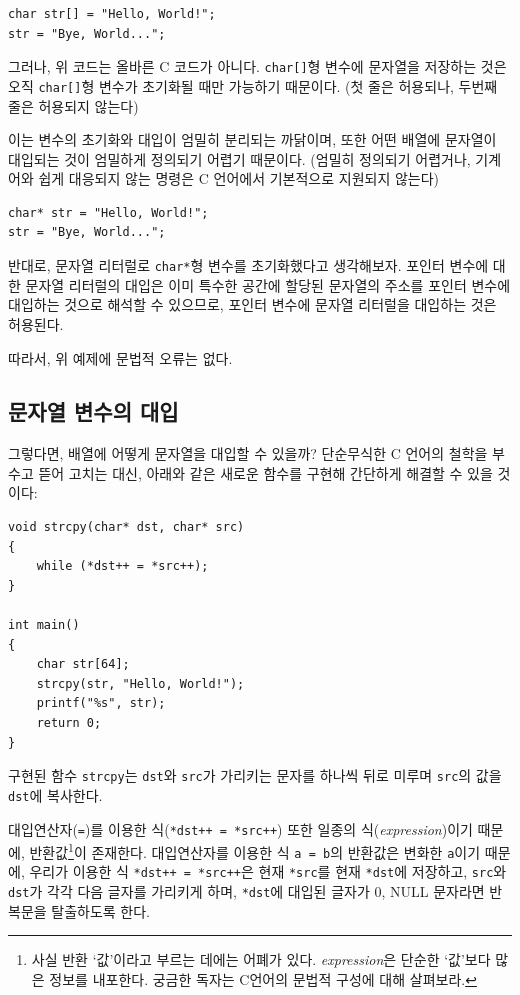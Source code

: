 \documentclass[a4paper,12pt]{book}
\newcommand{\V}[1]{\Verb|#1|}
\begin{document}
        \begin{lstlisting}
char str[] = "Hello, World!";
str = "Bye, World...";
        \end{lstlisting}

        그러나, 위 코드는 올바른 C 코드가 아니다.
        \V{char[]}형 변수에 문자열을 저장하는 것은
        오직 \V{char[]}형 변수가 초기화될 때만 가능하기 때문이다.
        (첫 줄은 허용되나, 두번째 줄은 허용되지 않는다)

        이는 변수의 초기화와 대입이 엄밀히 분리되는 까닭이며,
        또한 어떤 배열에 문자열이 대입되는 것이 엄밀하게 정의되기 어렵기 때문이다.
        (엄밀히 정의되기 어렵거나, 기계어와 쉽게 대응되지 않는 명령은 C 언어에서 기본적으로 지원되지 않는다)

        \begin{lstlisting}
char* str = "Hello, World!";
str = "Bye, World...";
        \end{lstlisting}

        반대로, 문자열 리터럴로 \V{char*}형 변수를 초기화했다고 생각해보자.
        포인터 변수에 대한 문자열 리터럴의 대입은
        이미 특수한 공간에 할당된 문자열의 주소를
        포인터 변수에 대입하는 것으로 해석할 수 있으므로,
        포인터 변수에 문자열 리터럴을 대입하는 것은 허용된다.
        
        따라서, 위 예제에 문법적 오류는 없다.

    \subsection{문자열 변수의 대입}

        그렇다면, 배열에 어떻게 문자열을 대입할 수 있을까?
        단순무식한 C 언어의 철학을 부수고 뜯어 고치는 대신,
        아래와 같은 새로운 함수를 구현해 간단하게 해결할 수 있을 것이다:

        \begin{lstlisting}
void strcpy(char* dst, char* src)
{
    while (*dst++ = *src++);
}

int main()
{
    char str[64];
    strcpy(str, "Hello, World!");
    printf("%s", str);
    return 0;
}
        \end{lstlisting}

        구현된 함수 \V{strcpy}는 \V{dst}와 \V{src}가 가리키는 문자를 하나씩 뒤로 미루며
        \V{src}의 값을 \V{dst}에 복사한다.

        대입연산자(\V{=})를 이용한 식(\V{*dst++ = *src++}) 또한
        일종의 식(\textit{expression})이기 때문에,
        반환값\footnote{
            사실 반환 `값'이라고 부르는 데에는 어폐가 있다. 
            \textit{expression}은 단순한 `값'보다 많은 정보를 내포한다.
            궁금한 독자는 C언어의 문법적 구성에 대해 살펴보라.
        }이 존재한다.
        대입연산자를 이용한 식 \V{a = b}의 반환값은 변화한 \V{a}이기 때문에,
        우리가 이용한 식 \V{*dst++ = *src++}은 현재 \V{*src}를 현재 \V{*dst}에 저장하고,
        \V{src}와 \V{dst}가 각각 다음 글자를 가리키게 하며,
        \V{*dst}에 대입된 글자가 0, NULL 문자라면 반복문을 탈출하도록 한다.
\end{document}
